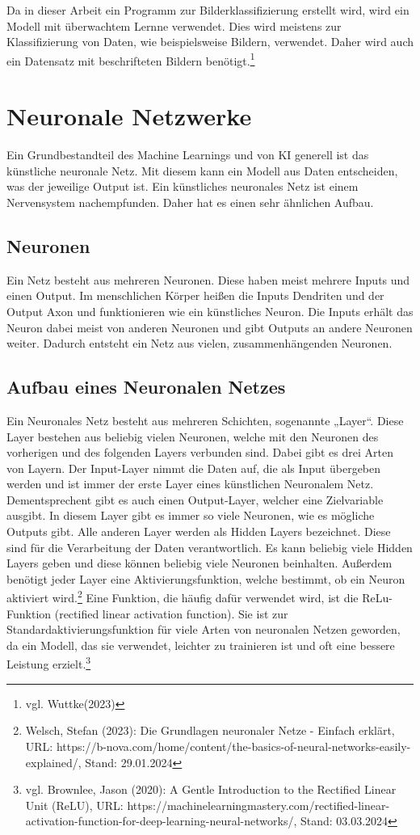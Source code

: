 \documentclass[11pt,oneside]{report}
\begin{document}
Da in dieser Arbeit ein Programm zur Bilderklassifizierung erstellt wird, wird ein Modell mit überwachtem Lernne verwendet. Dies wird meistens zur Klassifizierung von Daten, wie beispielsweise Bildern, verwendet. Daher wird auch ein Datensatz mit beschrifteten Bildern benötigt.\footnote{vgl. Wuttke(2023)}


\section{Neuronale Netzwerke}
Ein Grundbestandteil des Machine Learnings und von KI generell ist das künstliche neuronale Netz. Mit diesem kann ein Modell aus Daten entscheiden, was der jeweilige Output ist. Ein künstliches neuronales Netz ist einem Nervensystem nachempfunden. Daher hat es einen sehr ähnlichen Aufbau.

\subsection{Neuronen}
Ein Netz besteht aus mehreren Neuronen. Diese haben meist mehrere Inputs und einen Output. Im menschlichen Körper heißen die Inputs Dendriten und der Output Axon und funktionieren wie ein künstliches Neuron. Die Inputs erhält das Neuron dabei meist von anderen Neuronen und gibt Outputs an andere Neuronen weiter. Dadurch entsteht ein Netz aus vielen, zusammenhängenden Neuronen.

\subsection{Aufbau eines Neuronalen Netzes}
Ein Neuronales Netz besteht aus mehreren Schichten, sogenannte „Layer“. Diese Layer bestehen aus beliebig vielen Neuronen, welche mit den Neuronen des vorherigen und des folgenden Layers verbunden sind. Dabei gibt es drei Arten von Layern. Der Input-Layer nimmt die Daten auf, die als Input übergeben werden und ist immer der erste Layer eines künstlichen Neuronalem Netz. Dementsprechent gibt es auch einen Output-Layer, welcher eine Zielvariable ausgibt. In diesem Layer gibt es immer so viele Neuronen, wie es mögliche Outputs gibt. Alle anderen Layer werden als Hidden Layers bezeichnet. Diese sind für die Verarbeitung der Daten verantwortlich. Es kann beliebig viele Hidden Layers geben und diese können beliebig viele Neuronen beinhalten. Außerdem benötigt jeder Layer eine Aktivierungsfunktion, welche bestimmt, ob ein Neuron aktiviert wird.\footnote{Welsch, Stefan (2023): Die Grundlagen neuronaler Netze - Einfach erklärt, URL: https://b-nova.com/home/content/the-basics-of-neural-networks-easily-explained/, Stand: 29.01.2024} Eine Funktion, die häufig dafür verwendet wird, ist die ReLu-Funktion (rectified linear activation function). Sie ist zur Standardaktivierungsfunktion für viele Arten von neuronalen Netzen geworden, da ein Modell, das sie verwendet, leichter zu trainieren ist und oft eine bessere Leistung erzielt.\footnote{vgl. Brownlee, Jason (2020): A Gentle Introduction to the Rectified Linear Unit (ReLU), URL: https://machinelearningmastery.com/rectified-linear-activation-function-for-deep-learning-neural-networks/, Stand: 03.03.2024}
\end{document}
